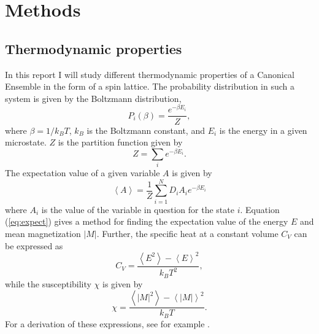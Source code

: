 \section{Methods}
\label{sec:methods}

\subsection{Thermodynamic properties}
In this report I will study different thermodynamic properties of a Canonical Ensemble in the form of a spin lattice. The probability distribution in such a system is given by the Boltzmann distribution,  
\begin{equation}\label{eq:prob}
	P_i(\beta) =  \frac{e^{-\beta E_i}}{Z},
\end{equation}
where $\beta = 1/{k_B T}$, $k_B$ is the Boltzmann constant, and $E_i$ is the energy in a given microstate. $Z$ is the partition function given by 
\begin{equation}
 Z = \sum_{i}  e^{-\beta E_i}.
\end{equation}
 The expectation value of a given variable $A$ is given by 
 \begin{equation}\label{eq:expect}
  \left\langle A\right\rangle = \frac{1}{Z}\sum_{i=1}^{N} D_i A_i  e^{- \beta E_i} 
 \end{equation}   
 where $A_i$ is the value of the variable in question for the state $i$. Equation (\ref{eq:expect}) gives a method for finding the expectation value of the energy $E$ and mean magnetization $|M|$. Further, the specific heat at a constant volume $C_V$ can be expressed as  
 \begin{equation}
	 C_V = \frac{\left\langle E^2\right\rangle - \left\langle E\right\rangle ^2}{k_BT^2},
 \end{equation}
 while the susceptibility $\chi$ is given by 
  \begin{equation}
  \chi = \frac{\left\langle |M|^2\right\rangle - \left\langle |M|\right\rangle ^2}{k_BT}.
  \end{equation}
 For a derivation of these expressions, see for example \cite{schroeder}.
 
